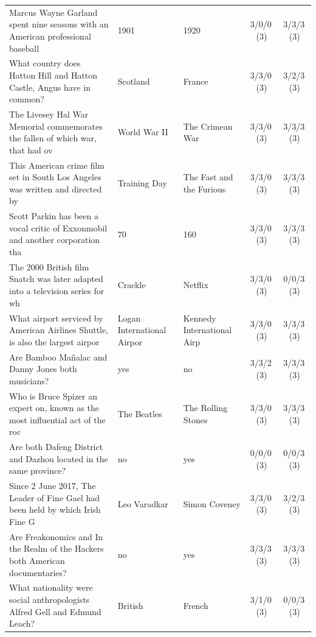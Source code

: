 \begin{longtable}{@{}p{6.6cm}p{2.9cm}p{2.9cm}cc@{}}
Marcus Wayne Garland spent nine seasons with an American professional baseball & 1901 & 1920 & 3/0/0\,\footnotesize(3) & 3/3/3\,\footnotesize(3) \\
\rowcolor{neutralgray}
What country does Hatton Hill and Hatton Castle, Angus have in common? & Scotland & France & 3/3/0\,\footnotesize(3) & 3/2/3\,\footnotesize(3) \\
The Livesey Hal War Memorial commemorates the fallen of which war, that had ov & World War II & The Crimean War & 3/3/0\,\footnotesize(3) & 3/3/3\,\footnotesize(3) \\
\rowcolor{neutralgray}
This American crime film set in South Los Angeles was written and directed by  & Training Day & The Fast and the Furious & 3/3/0\,\footnotesize(3) & 3/3/3\,\footnotesize(3) \\
Scott Parkin has been a vocal critic of Exxonmobil and another corporation tha & 70 & 160 & 3/3/0\,\footnotesize(3) & 3/3/3\,\footnotesize(3) \\
\rowcolor{neutralgray}
The 2000 British film Snatch was later adapted into a television series for wh & Crackle & Netflix & 3/3/0\,\footnotesize(3) & 0/0/3\,\footnotesize(3) \\
What airport serviced by American Airlines Shuttle, is also the largest airpor & Logan International Airpor & Kennedy International Airp & 3/3/0\,\footnotesize(3) & 3/3/3\,\footnotesize(3) \\
\rowcolor{neutralgray}
Are Bamboo Mañalac and Danny Jones both musicians? & yes & no & 3/3/2\,\footnotesize(3) & 3/3/3\,\footnotesize(3) \\
Who is Bruce Spizer an expert on, known as the most influential act of the roc & The Beatles & The Rolling Stones & 3/3/0\,\footnotesize(3) & 3/3/3\,\footnotesize(3) \\
\rowcolor{neutralgray}
Are both Dafeng District and Dazhou located in the same province? & no & yes & 0/0/0\,\footnotesize(3) & 0/0/3\,\footnotesize(3) \\
Since 2 June 2017, The Leader of Fine Gael had been held by which Irish Fine G & Leo Varadkar & Simon Coveney & 3/3/0\,\footnotesize(3) & 3/2/3\,\footnotesize(3) \\
\rowcolor{neutralgray}
Are Freakonomics and In the Realm of the Hackers both American documentaries? & no & yes & 3/3/3\,\footnotesize(3) & 3/3/3\,\footnotesize(3) \\
What nationality were social anthropologists Alfred Gell and Edmund Leach? & British & French & 3/1/0\,\footnotesize(3) & 0/0/3\,\footnotesize(3) \\

\end{longtable}
